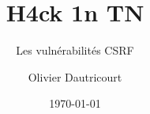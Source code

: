 \documentclass{beamer}
\title[failles csrf]{H4ck 1n TN}
\subtitle{Les vulnérabilités CSRF}
\author[H4ck1nTN]{Olivier Dautricourt}
\date{\today}
\begin{document}
\begin{frame}
\titlepage
\end{frame} 







\end{document}
